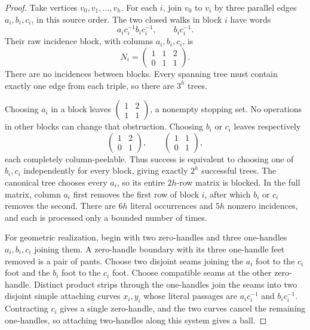 \begin{proof}
Take vertices $v_0,v_1,\ldots,v_h$.  For each $i$, join $v_0$ to $v_i$ by
three parallel edges $a_i,b_i,c_i$, in this source order.  The two closed
walks in block $i$ have words
\[
 a_ic_i^{-1}b_ic_i^{-1},\qquad b_ic_i^{-1}.
\]
Their raw incidence block, with columns $a_i,b_i,c_i$, is
\[
 N_i=\begin{pmatrix}1&1&2\\0&1&1\end{pmatrix}.
\]
There are no incidences between blocks.  Every spanning tree must contain
exactly one edge from each triple, so there are $3^h$ trees.

Choosing $a_i$ in a block leaves
$\left(\begin{smallmatrix}1&2\\1&1\end{smallmatrix}\right)$, a nonempty
stopping set.  No operations in other blocks can change that obstruction.
Choosing $b_i$ or $c_i$ leaves respectively
\[
 \begin{pmatrix}1&2\\0&1\end{pmatrix},\qquad
 \begin{pmatrix}1&1\\0&1\end{pmatrix},
\]
each completely column-peelable.  Thus success is equivalent to choosing
one of $b_i,c_i$ independently for every block, giving exactly $2^h$
successful trees.  The canonical tree chooses every $a_i$, so its entire
$2h$-row matrix is blocked.  In the full matrix, column $a_i$ first removes
the first row of block $i$, after which $b_i$ or $c_i$ removes the second.
There are $6h$ literal occurrences and $5h$ nonzero incidences, and each is
processed only a bounded number of times.

For geometric realization, begin with two zero-handles and three
one-handles $a_i,b_i,c_i$ joining them.  A zero-handle boundary with its
three one-handle feet removed is a pair of pants.  Choose two disjoint
seams joining the $a_i$ foot to the $c_i$ foot and the $b_i$ foot to the
$c_i$ foot.  Choose compatible seams at the other zero-handle.  Distinct
product strips through the one-handles join the seams into two disjoint
simple attaching curves $x_i,y_i$ whose literal passages are
$a_ic_i^{-1}$ and $b_ic_i^{-1}$.  Contracting $c_i$ gives a single
zero-handle, and the two curves cancel the remaining one-handles, so
attaching two-handles along this system gives a ball.


\end{proof}
